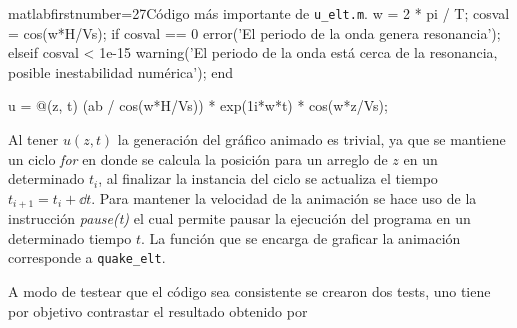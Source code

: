 \begin{sourcecodep}{matlab}{firstnumber=27}{Código más importante de \texttt{u\_elt.m}.}
w = 2 * pi / T;
cosval = cos(w*H/Vs);
if cosval == 0
	error('El periodo de la onda genera resonancia');
elseif cosval < 1e-15
	warning('El periodo de la onda está cerca de la resonancia, posible inestabilidad numérica');
end

u = @(z, t) (ab / cos(w*H/Vs)) * exp(1i*w*t) * cos(w*z/Vs);
\end{sourcecodep}

\newp Al tener $u(z,t)$ la generación del gráfico animado es trivial, ya que se mantiene un ciclo \textit{for} en donde se calcula la posición para un arreglo de $z$ en un determinado $t_i$, al finalizar la instancia del ciclo se actualiza el tiempo $t_{i+1} = t_{i} + \dd t$. Para mantener la velocidad de la animación se hace uso de la instrucción \textit{pause(t)} el cual permite pausar la ejecución del programa en un determinado tiempo $t$. La función que se encarga de graficar la animación corresponde a \texttt{quake\_elt}.


A modo de testear que el código sea consistente se crearon dos tests, uno tiene por objetivo contrastar el resultado obtenido por 